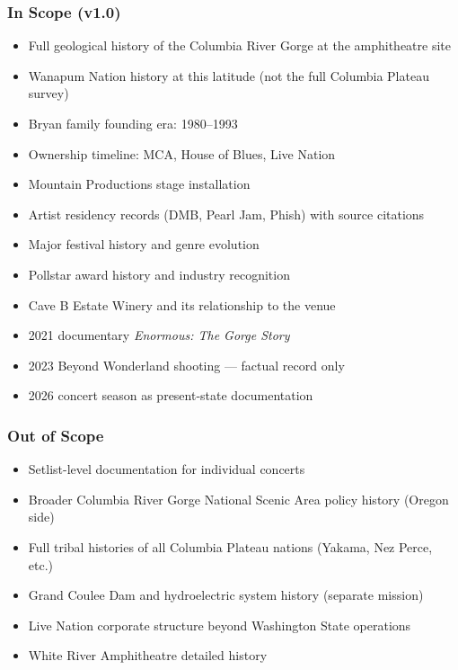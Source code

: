 \documentclass[11pt,letterpaper]{article}
\begin{document}
\subsubsection{In Scope (v1.0)}
\begin{itemize}[noitemsep]
  \item Full geological history of the Columbia River Gorge at the amphitheatre site
  \item Wanapum Nation history at this latitude (not the full Columbia Plateau survey)
  \item Bryan family founding era: 1980--1993
  \item Ownership timeline: MCA, House of Blues, Live Nation
  \item Mountain Productions stage installation
  \item Artist residency records (DMB, Pearl Jam, Phish) with source citations
  \item Major festival history and genre evolution
  \item Pollstar award history and industry recognition
  \item Cave B Estate Winery and its relationship to the venue
  \item 2021 documentary \textit{Enormous: The Gorge Story}
  \item 2023 Beyond Wonderland shooting --- factual record only
  \item 2026 concert season as present-state documentation
\end{itemize}

\subsubsection{Out of Scope}
\begin{itemize}[noitemsep]
  \item Setlist-level documentation for individual concerts
  \item Broader Columbia River Gorge National Scenic Area policy history (Oregon side)
  \item Full tribal histories of all Columbia Plateau nations (Yakama, Nez Perce, etc.)
  \item Grand Coulee Dam and hydroelectric system history (separate mission)
  \item Live Nation corporate structure beyond Washington State operations
  \item White River Amphitheatre detailed history
\end{itemize}
\end{document}
